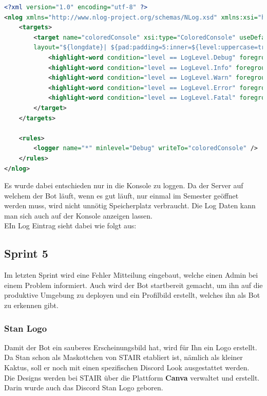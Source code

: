 \documentclass[a4paper, table]{article}
\begin{document}
\begin{lstlisting}[language=XML]
<?xml version="1.0" encoding="utf-8" ?>
<nlog xmlns="http://www.nlog-project.org/schemas/NLog.xsd" xmlns:xsi="http://www.w3.org/2001/XMLSchema-instance">
    <targets>
        <target name="coloredConsole" xsi:type="ColoredConsole" useDefaultRowHighlightingRules="false"
        layout="${longdate}| ${pad:padding=5:inner=${level:uppercase=true}}| ${pad:padding=-50:inner=${logger}}| ${message:withexception=true}" >
            <highlight-word condition="level == LogLevel.Debug" foregroundColor="Gray" text="DEBUG"/>
            <highlight-word condition="level == LogLevel.Info" foregroundColor="Green" text="INFO" />
            <highlight-word condition="level == LogLevel.Warn" foregroundColor="Yellow" text="WARN" />
            <highlight-word condition="level == LogLevel.Error" foregroundColor="Red" text="ERROR"/>
            <highlight-word condition="level == LogLevel.Fatal" foregroundColor="Red" text="FATAL" backgroundColor="White" />
        </target>
    </targets>

    <rules>
        <logger name="*" minlevel="Debug" writeTo="coloredConsole" />
    </rules>
</nlog>
\end{lstlisting}

Es wurde dabei entschieden nur in die Konsole zu loggen.
Da der Server auf welchem der Bot läuft, wenn es gut läuft, nur einmal im Semester geöffnet werden muss,
wird nicht unnötig Speicherplatz verbraucht.
Die Log Daten kann man sich auch auf der Konsole anzeigen lassen.\\
EIn Log Eintrag sieht dabei wie folgt aus:

\newpage
\subsection{Sprint 5}
Im letzten Sprint wird eine Fehler Mitteilung eingebaut, welche einen Admin bei einem Problem informiert.
Auch wird der Bot startbereit gemacht, um ihn auf die produktive Umgebung zu deployen und ein Profilbild erstellt, 
welches ihn als Bot zu erkennen gibt.

\subsubsection{Stan Logo}
Damit der Bot ein sauberes Erscheinungsbild hat, wird für Ihn ein Logo erstellt.
Da Stan schon als Maskottchen von STAIR etabliert ist, nämlich als kleiner Kaktus, 
soll er noch mit einen spezifischen Discord Look ausgestattet werden.\\
Die Designs werden bei STAIR über die Plattform \textbf{Canva} verwaltet und erstellt. \autocite{}
Darin wurde auch das Discord Stan Logo geboren.
\end{document}
